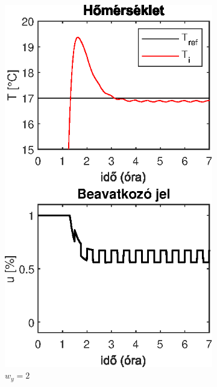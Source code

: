 \begin{figure}[H]
\begin{subfigure}[t]{0.32\textwidth}
		\includegraphics[width=\textwidth]{figures/realsys/mpc-wy-2}
		\caption{$w_y=2$}
		\label{fig:mpc-wy-2}
	\end{subfigure}
	~
	\begin{subfigure}[t]{0.32\textwidth}
		\centering

\end{subfigure}
\end{figure}

